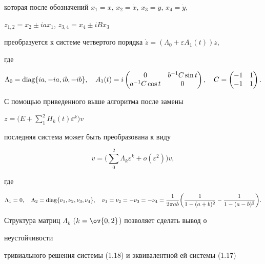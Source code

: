 которая после обозначений $x_1=x$, $x_2=\Dot x$, $x_3=y$, $x_4=\Dot y$, 


$z_{1,2}=x_2\pm i a x_1$, $z_{3,4}=x_4\pm i B x_3$ 


преобразуется к системе четвертого порядка $\Dot 


z=(\Lambda_0+\varepsilon A_1(t))z$, 


где 


$$ 


\Lambda_0=\diag\{i a,-i a,i b,-i b\},\quad 


A_1(t)=i 


\begin{pmatrix} 


0 & b^{-1}C\sin t \\ a^{-1}C\cos t & 0 


\end{pmatrix} 


,\quad 


C=\begin{pmatrix} 


-1 & 1 \\ -1 & 1 


\end{pmatrix} 


. 


$$ 


С помощью приведенного выше алгоритма после замены 


$z=\Big(E+\sum\limits^2_1H_k(t)\varepsilon^k\Big)v$ 


последняя система может быть преобразована к виду 


\begin{equation} 


\Dot v=\bigg(\sum^2_0\Lambda_k\varepsilon^k+o(\varepsilon^2)\bigg)v, 


\end{equation} 


где  


$$ 


\Lambda_1=0,\quad \Lambda_2=\diag\{\nu_1,\nu_2,\nu_3,\nu_4\},\quad 


\nu_1=\nu_2=-\nu_3=-\nu_4=\frac{1}{2\pi a b}\bigg( 


\frac{1}{1-(a+b)^2}-\frac{1}{1-(a-b)^2}\bigg). 


$$ 


Структура матриц $\Lambda_k$ ($k=\ov{0,2}$) позволяет сделать вывод о 


неустойчивости 


тривиального решения системы (1.18) и эквивалентной ей системы (1.17) 



